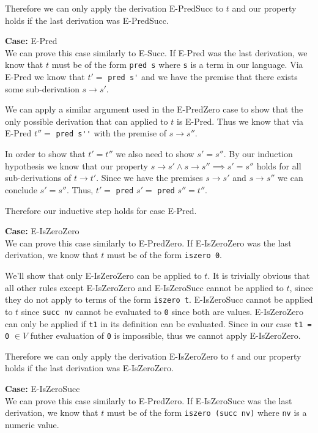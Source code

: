 \documentclass[12pt, fleqn]{article}
\begin{document}
\medskip
Therefore we can only apply the derivation E-PredSucc to $t$ and our property holds if the last derivation was E-PredSucc.

\medskip
\textbf{Case:} E-Pred\\
We can prove this case similarly to E-Succ.
If E-Pred was the last derivation, we know that $t$ must be of the form \verb|pred s| where \verb|s| is a term in our
language. Via E-Pred we know that $t' = $ \verb|pred s'| and we have the premise that there exists some sub-derivation $s \rightarrow s'$.

We can apply a similar argument used in the E-PredZero case to show that the only possible derivation that can applied to $t$ is
E-Pred. Thus we know that via E-Pred $t'' =$ \verb|pred s''| with the premise of $s \rightarrow s''$. 

In order to show that $t' = t''$ we also need to show $s' = s''$. By our induction hypothesis we know that our
property $s \rightarrow s' \land s \rightarrow s'' \implies s' = s''$ holds for all sub-derivations of $t \rightarrow t'$.
Since we have the premises $s \rightarrow s'$ and $s \rightarrow s''$ we can conclude $s' = s''$. 
Thus, $t' = $ \verb|pred| $s' =$ \verb|pred| $s'' = t''$.

Therefore our inductive step holds for case E-Pred.

\medskip
\textbf{Case:} E-IsZeroZero\\
We can prove this case similarly to E-PredZero. If E-IsZeroZero was the last derivation, 
we know that $t$ must be of the form \verb|iszero 0|.

\medskip
We'll show that only E-IsZeroZero can be applied to $t$. It is trivially obvious that all other rules except
E-IsZeroZero and E-IsZeroSucc cannot be applied to $t$, since they do not apply to terms of the form \verb|iszero t|.
E-IsZeroSucc cannot be applied to $t$ since \verb|succ nv| cannot be evaluated to \verb|0| since both are values.
E-IsZeroZero can only be applied if \verb|t1| in its definition can be evaluated. 
Since in our case \verb|t1 = 0| $\in V$ futher evaluation of \verb|0| is impossible, thus we cannot apply E-IsZeroZero.

\medskip
Therefore we can only apply the derivation E-IsZeroZero to $t$ and our property holds if the last derivation was E-IsZeroZero.

\medskip
\textbf{Case:} E-IsZeroSucc\\
We can prove this case similarly to E-PredZero. If E-IsZeroSucc was the last derivation, we know that $t$ must
be of the form \verb|iszero (succ nv)| where \verb|nv| is a numeric value.
\end{document}
